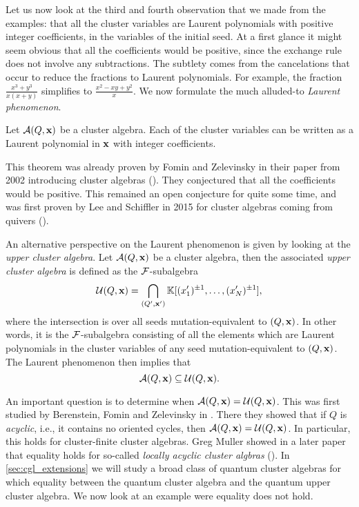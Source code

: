 \medskip

Let us now look at the third and fourth observation that we made from the examples:
that all the cluster variables are Laurent polynomials with positive integer
coefficients, in the variables of the initial seed. At a first glance it might seem
obvious that all the coefficients would be positive, since the exchange rule does not
involve any subtractions. The subtlety comes from the cancelations that occur to reduce
the fractions to Laurent polynomials. For example, the fraction $\frac{x^3 +
		y^3}{x(x+y)}$ simplifies to $\frac{x^2 - xy + y^2}{x}$. We now formulate the much
alluded-to \emph{Laurent phenomenon}.
\begin{theorem}\label{thm:laurent_phenomenon}

	Let $\mathcal{A} (Q, \mathbf{x})$ be a cluster algebra. Each of the cluster variables can be written
	as a Laurent polynomial in $\mathbf{x}$ with integer coefficients.
\end{theorem}
%
This theorem was already proven by Fomin and Zelevinsky in their paper from 2002
introducing cluster algebras (\cite[Theorem 3.1]{FominZelevinsky2002CAF}). They
conjectured that all the coefficients would be positive. This remained an open
conjecture for quite some time, and was first proven by Lee and Schiffler in 2015 for
cluster algebras coming from quivers (\cite{LeeSchiffler2015PositivityCA}).

An alternative perspective on the Laurent phenomenon is given by looking at the
\emph{upper cluster algebra}. Let $\mathcal{A}(Q, \mathbf{x})$ be a
cluster algebra, then the associated \emph{upper cluster algebra} is defined as the
$\mathcal{F}$-subalgebra
\begin{equation*}
	\mathcal{U}(Q, \mathbf{x}) = \bigcap_{(Q', \mathbf{x}')} \mathbb{K}[(x_1')^{\pm 1}, \dots, (x'_N)^{\pm 1}],
\end{equation*}
%
where the intersection is over all seeds mutation-equivalent to $(Q, \mathbf{x})$. In other
words, it is the $\mathcal{F}$-subalgebra consisting of all the elements which are Laurent
polynomials in the cluster variables of any seed mutation-equivalent to $(Q, \mathbf{x})$. The
Laurent phenomenon then implies that
\begin{equation*}
	\mathcal{A}(Q, \mathbf{x}) \subseteq \mathcal{U}(Q, \mathbf{x}).
\end{equation*}

An important question is to determine when $\mathcal{A}(Q, \mathbf{x}) = \mathcal{U}(Q, \mathbf{x})$. This was
first studied by Berenstein, Fomin and Zelevinsky in
\cite{BerensteinFominZelevinsky2005CA3UpperBoundsDBC}. There they showed that if $Q$ is
\emph{acyclic}, i.e., it contains no oriented cycles, then
$\mathcal{A}(Q, \mathbf{x}) = \mathcal{U}(Q, \mathbf{x})$. In particular, this holds for cluster-finite cluster
algebras. Greg Muller showed in a later paper that equality holds for so-called
\emph{locally acyclic cluster algbras}
(\cite{Muller2013LocallyAcyclicCA}). In \cref{sec:cgl_extensions} we will study a broad
class of quantum cluster algebras for which equality between the quantum cluster
algebra and the quantum upper cluster algebra. We now look at an example were equality
does not hold.


